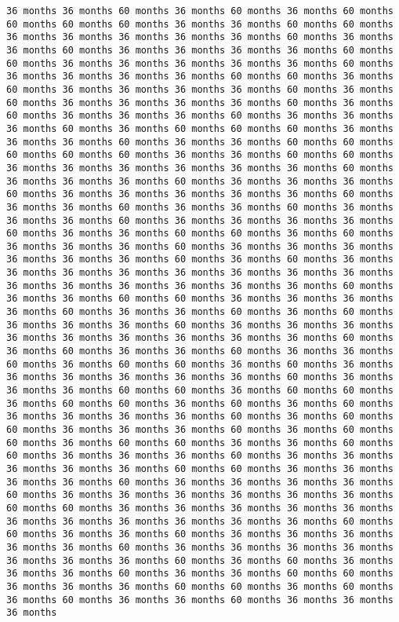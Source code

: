\documentclass[11pt]{article}
\begin{document}
\begin{Verbatim}[commandchars=\\\{\}, frame=single, framerule=2mm, rulecolor=\color{outerrorbackground}]
36 months 36 months 60 months 36 months 60 months 36 months 60 months 60 months 60 months 60 months 36 months 36 months 60 months 60 months 36 months 36 months 36 months 36 months 36 months 60 months 36 months 36 months 60 months 36 months 36 months 36 months 36 months 60 months 60 months 36 months 36 months 36 months 36 months 36 months 60 months 36 months 36 months 36 months 36 months 60 months 60 months 36 months 60 months 36 months 36 months 36 months 36 months 60 months 36 months 60 months 36 months 36 months 36 months 36 months 60 months 36 months 60 months 36 months 36 months 36 months 60 months 36 months 36 months 36 months 60 months 36 months 60 months 60 months 60 months 36 months 36 months 36 months 60 months 36 months 36 months 60 months 60 months 60 months 60 months 60 months 36 months 36 months 60 months 60 months 36 months 36 months 36 months 36 months 36 months 36 months 60 months 36 months 36 months 36 months 60 months 36 months 36 months 36 months 60 months 36 months 36 months 36 months 36 months 36 months 60 months 36 months 36 months 60 months 36 months 36 months 60 months 36 months 36 months 36 months 60 months 36 months 36 months 36 months 36 months 60 months 36 months 36 months 60 months 60 months 36 months 60 months 36 months 36 months 36 months 60 months 36 months 36 months 36 months 36 months 36 months 36 months 60 months 36 months 60 months 36 months 36 months 36 months 36 months 36 months 36 months 36 months 36 months 36 months 36 months 36 months 36 months 36 months 36 months 60 months 36 months 36 months 60 months 60 months 36 months 36 months 36 months 36 months 60 months 36 months 36 months 60 months 36 months 60 months 36 months 36 months 36 months 60 months 36 months 36 months 36 months 36 months 36 months 36 months 36 months 36 months 36 months 60 months 36 months 60 months 36 months 36 months 60 months 36 months 36 months 60 months 36 months 60 months 60 months 36 months 60 months 36 months 36 months 36 months 36 months 36 months 36 months 60 months 36 months 36 months 36 months 60 months 60 months 36 months 60 months 60 months 36 months 60 months 60 months 36 months 60 months 36 months 60 months 36 months 36 months 36 months 36 months 60 months 36 months 60 months 60 months 36 months 36 months 36 months 60 months 36 months 60 months 60 months 36 months 60 months 60 months 36 months 36 months 60 months 60 months 36 months 36 months 36 months 60 months 36 months 36 months 36 months 36 months 36 months 60 months 60 months 36 months 36 months 36 months 36 months 60 months 36 months 36 months 36 months 36 months 60 months 36 months 36 months 36 months 36 months 36 months 36 months 60 months 60 months 36 months 36 months 36 months 36 months 36 months 36 months 36 months 36 months 36 months 36 months 36 months 60 months 60 months 36 months 36 months 60 months 36 months 36 months 36 months 36 months 36 months 60 months 36 months 36 months 36 months 36 months 36 months 36 months 36 months 60 months 36 months 60 months 36 months 36 months 36 months 60 months 36 months 36 months 60 months 60 months 36 months 36 months 36 months 60 months 60 months 36 months 60 months 36 months 60 months 36 months 36 months 60 months 36 months 36 months 36 months 
\end{Verbatim}
\end{document}
